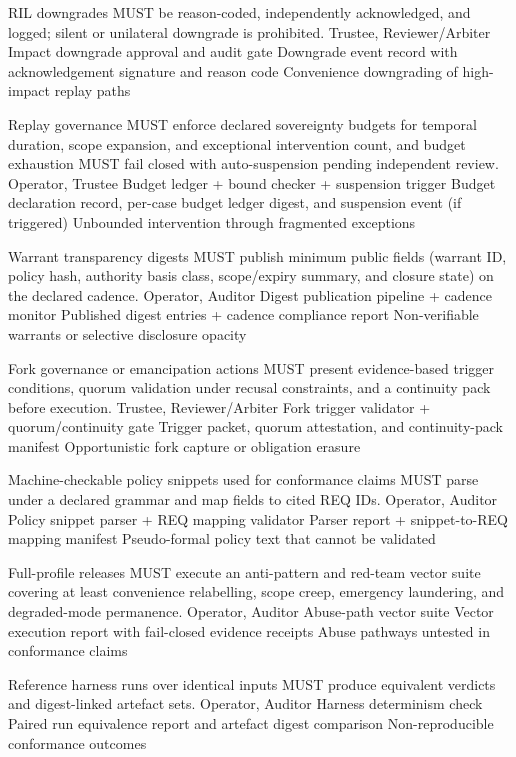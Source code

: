 \documentclass[11pt]{article}
\theoremstyle{definition}
\theoremstyle{plain}
\theoremstyle{remark}
\begin{document}
{RIL downgrades MUST be reason-coded, independently acknowledged, and logged; silent or unilateral downgrade is prohibited.}
{Trustee, Reviewer/Arbiter}
{Impact downgrade approval and audit gate}
{Downgrade event record with acknowledgement signature and reason code}
{Convenience downgrading of high-impact replay paths}

{Replay governance MUST enforce declared sovereignty budgets for temporal duration, scope expansion, and exceptional intervention count, and budget exhaustion MUST fail closed with auto-suspension pending independent review.}
{Operator, Trustee}
{Budget ledger + bound checker + suspension trigger}
{Budget declaration record, per-case budget ledger digest, and suspension event (if triggered)}
{Unbounded intervention through fragmented exceptions}

{Warrant transparency digests MUST publish minimum public fields (warrant ID, policy hash, authority basis class, scope/expiry summary, and closure state) on the declared cadence.}
{Operator, Auditor}
{Digest publication pipeline + cadence monitor}
{Published digest entries + cadence compliance report}
{Non-verifiable warrants or selective disclosure opacity}

{Fork governance or emancipation actions MUST present evidence-based trigger conditions, quorum validation under recusal constraints, and a continuity pack before execution.}
{Trustee, Reviewer/Arbiter}
{Fork trigger validator + quorum/continuity gate}
{Trigger packet, quorum attestation, and continuity-pack manifest}
{Opportunistic fork capture or obligation erasure}

{Machine-checkable policy snippets used for conformance claims MUST parse under a declared grammar and map fields to cited REQ IDs.}
{Operator, Auditor}
{Policy snippet parser + REQ mapping validator}
{Parser report + snippet-to-REQ mapping manifest}
{Pseudo-formal policy text that cannot be validated}

{Full-profile releases MUST execute an anti-pattern and red-team vector suite covering at least convenience relabelling, scope creep, emergency laundering, and degraded-mode permanence.}
{Operator, Auditor}
{Abuse-path vector suite}
{Vector execution report with fail-closed evidence receipts}
{Abuse pathways untested in conformance claims}

{Reference harness runs over identical inputs MUST produce equivalent verdicts and digest-linked artefact sets.}
{Operator, Auditor}
{Harness determinism check}
{Paired run equivalence report and artefact digest comparison}
{Non-reproducible conformance outcomes}
\end{document}
